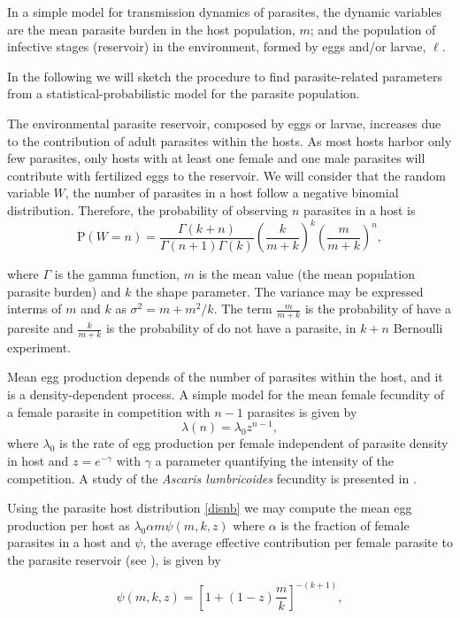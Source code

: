\documentclass[eng]{MMSB-class-eng}
\begin{document}
In a simple model for transmission dynamics of parasites, 
the dynamic variables  are the mean parasite burden in the host population, $m$; and the population of infective stages (reservoir) in the environment, formed by eggs and/or larvae, $\ell$. 

In the following we will sketch the procedure to find parasite-related parameters from a statistical-probabilistic model for the parasite population.

The environmental parasite reservoir, composed by eggs or larvae, increases due to the contribution of adult parasites within the hosts. As most hosts harbor only few parasites, only hosts with at least one female and one male parasites will contribute with fertilized eggs to the reservoir. We will consider that the random variable $W$, the number of parasites in a host follow a negative binomial distribution. 
Therefore, the probability of observing $n$ parasites in a host is
\begin{equation}\label{disnb}
\mathrm{P}(W=n)=\frac{\Gamma(k+n)}{\Gamma(n+1)\Gamma(k)}\left( \frac{k}{m+k}\right) ^{k} \left( \frac{m}{m+k}\right) ^n,
\end{equation}
{\color{red}
where $\Gamma$ is the gamma function,  
$m$ is the mean value (the mean population parasite burden) and $k$ the shape parameter. The variance may be expressed interms of  $m$ and  $k$ as $\sigma^2=m+m^2/k$. 
The term $\frac{m}{m+k}$ is the probability of have a paresite and $\frac{k}{m+k}$ is the  probability of do not have a parasite, 
in $k+n$ Bernoulli experiment. 



Mean egg production depends of the number of parasites within the host, and it is a density-dependent process. 
A simple model for the mean female fecundity of a female parasite in competition with $n-1$ parasites is given by 
\begin{equation}
\lambda(n)=\lambda_0 z^{n-1},
\end{equation}
where $\lambda_0$ is the rate of egg production per female independent of parasite density in host and $z=e^{-\gamma}$ with $\gamma$ a parameter quantifying the intensity of the competition. A study of the \textit{Ascaris lumbricoides} fecundity is presented in \citet{hall2000geographical}. 


Using the parasite host distribution \eqref{disnb} we may compute the mean egg production per host as \citep{lopez2022general}
$\lambda_0
\alpha m
\psi(m,k,z)$
where $\alpha$  is the fraction of female parasites in a host and $\psi$, the average effective contribution per female parasite to the parasite reservoir (see \citet{churcher2006density,lopez2022general}), is given by}
\begin{equation}\label{psi}
\psi(m,k,z)=\left[ 1+(1-z)\dfrac{m}{k}\right]^{-(k+1)},
\end{equation}
\end{document}
